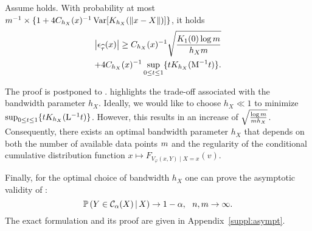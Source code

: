  \begin{proposition}\label{cor:epsilon-tau:local-cdf}
    Assume  holds.
    With probability at most $m^{-1}\times \{ 1 + 4 C_{h_{X}}(x)^{-1} \operatorname{Var}[K_{h_{X}}(\|x - X\|)] \}$, it holds
    \begin{multline*}
      \left\lvert{\epsilon_{\widehat{\tau}}(x)}\right\rvert
      \ge C_{h_{X}}(x)^{-1} \sqrt{\frac{ K_{1}(0) \log m }{ h_{X} m }}
      \\
      + 4 C_{h_{X}}(x)^{-1} \sup_{0\le t \le 1} \{{t K_{h_{X}}( \mathrm{M}^{-1} t ) }\}
      .
    \end{multline*}
  \end{proposition}
  The proof is postponed to .  highlights the trade-off associated with the bandwidth parameter $h_{X}$. Ideally, we would like to choose $h_{X} \ll 1$ to minimize $\sup_{0\le t \le 1} \{{t K_{h_{X}}( \mathrm{L}^{-1} t ) }\}$. However, this results in an increase of $\sqrt{\frac{\log m}{m h_{X}}}$. Consequently, there exists an optimal bandwidth parameter $h_{X}$ that depends on both the number of available data points $m$ and the regularity of the conditional cumulative distribution function $x\mapsto F_{V_\varphi(x,Y)\mid X=x}(v)$.

  Finally, for the optimal choice of bandwidth $h_{X}$ one can prove the asymptotic validity of \RCP:
  \begin{equation}
    \mathbb{P}\left({Y\in \mathcal{C}_{\alpha}(X) \,\vert\, X}\right) \to 1 - \alpha, ~~ n, m \to \infty
    .
  \end{equation}
  The exact formulation and its proof are given in Appendix~\ref{suppl:asympt}.
